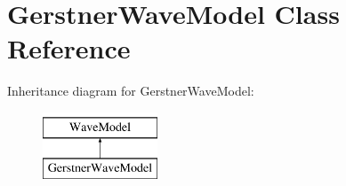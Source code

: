 \hypertarget{classGerstnerWaveModel}{\section{Gerstner\-Wave\-Model Class Reference}
\label{classGerstnerWaveModel}
}
Inheritance diagram for Gerstner\-Wave\-Model\-:\begin{figure}[H]
\begin{center}
\leavevmode
\includegraphics[height=2.000000cm]{classGerstnerWaveModel}
\end{center}
\end{figure}

